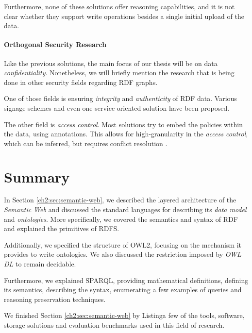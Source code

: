 Furthermore, none of these solutions offer reasoning capabilities, and it is not clear whether they support write operations besides a single initial upload of the data.

\paragraph{Orthogonal Security Research} Like the previous solutions, the main focus of our thesis will be on data \emph{confidentiality}. Nonetheless, we will briefly mention the research that is being done in other security fields regarding \gls{RDF} graphs.  

One of those fields is ensuring \emph{integrity} and \emph{authenticity} of \gls{RDF} data. Various signage schemes \autocite{Carroll2003-zi, Tummarello2005-qb,Kasten2013-rf, Kasten2014-ru, Kasten2014-ny, Sutton2018-ya} and even one service-oriented solution \autocite{Mana2011-bm} have been proposed. 

The other field is \emph{access control}. Most solutions try to embed the policies within the data, using annotations. This allows for high-granularity in the \emph{access control}, which can be inferred, but requires conflict resolution \autocite{Jain2006-zy, Abel2007-sf, Flouris2010-bf, Papakonstantinou2012-cu, Costabello2012-ow,Kirrane2013-ef, Costabello2013-tb}. 


\section{Summary}
\label{ch2:sec:summary}

In Section \ref{ch2:sec:semantic-web}, we described the layered architecture of the \emph{Semantic Web} and discussed the standard languages for describing its \emph{data model} and \emph{ontologies}. More specifically, we covered the semantics and syntax of \gls{RDF} and explained the primitives of \gls{RDFS}. 

Additionally, we specified the structure of \gls{OWL2}, focusing on the mechanism it provides to write ontologies. We also discussed the restriction imposed by \emph{OWL DL} to remain decidable. 

Furthermore, we explained \gls{SPARQL}, providing mathematical definitions, defining its semantics, describing the syntax, enumerating a few examples of queries and reasoning preservation techniques.

We finished Section \ref{ch2:sec:semantic-web} by Listinga few of the tools, software, storage solutions and evaluation benchmarks used in this field of research.

